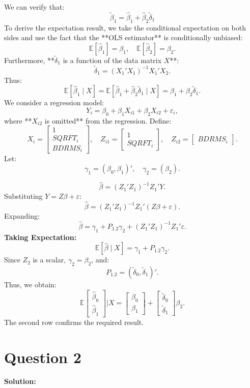 \documentclass[12pt, oneside]{article}
\begin{document}
We can verify that: 
\[
\tilde{\beta}_1 = \hat{\beta}_1 + \hat{\beta}_2 \tilde{\delta}_1
\]
To derive the expectation result, we take the conditional expectation on both sides and use the fact that the **OLS estimator** is conditionally unbiased:
\[
\mathbb{E}[\hat{\beta}_1] = \beta_1, \quad \mathbb{E}[\hat{\beta}_2] = \beta_2.
\]
Furthermore, **\(\tilde{\delta}_1\) is a function of the data matrix \(X\)**:
\[
\tilde{\delta}_1 = (X_1' X_1)^{-1} X_1' X_2.
\]
Thus:
\[
\mathbb{E}[\hat{\beta}_1 \mid X] = \mathbb{E}[\hat{\beta}_1 + \hat{\beta}_2 \tilde{\delta}_1 \mid X] = \beta_1 + \beta_2 \tilde{\delta}_1.
\]
We consider a regression model:
\[
Y_i = \beta_0 + \beta_1 X_{i1} + \beta_2 X_{i2} + \varepsilon_i,
\]
where **\(X_{i2}\) is omitted** from the regression. Define:
\[
X_i =
\begin{bmatrix} 1 \\ SQRFT_i \\ BDRMS_i \end{bmatrix}, \quad
Z_{i1} =
\begin{bmatrix} 1 \\ SQRFT_i \end{bmatrix}, \quad
Z_{i2} =
\begin{bmatrix} BDRMS_i \end{bmatrix}.
\]
Let:
\[
\gamma_1 = (\beta_0, \beta_1)', \quad \gamma_2 = (\beta_2).
\]

\[
\hat{\beta} = (Z_1'Z_1)^{-1} Z_1' Y.
\]
Substituting \( Y = Z\beta + \varepsilon \):
\[
\hat{\beta} = (Z_1'Z_1)^{-1} Z_1' (Z\beta + \varepsilon).
\]
Expanding:
\[
\hat{\beta} = \gamma_1 + P_{1.2} \gamma_2 + (Z_1'Z_1)^{-1} Z_1' \varepsilon.
\]
\textbf{Taking Expectation:}
\[
\mathbb{E}[\hat{\beta} \mid X] = \gamma_1 + P_{1.2} \gamma_2.
\]
Since \( Z_2 \) is a scalar, \( \gamma_2 = \beta_2 \), and:
\[
P_{1.2} = (\tilde{\delta}_0, \tilde{\delta}_1)'.
\]
Thus, we obtain:
\[
\mathbb{E}
\begin{bmatrix}
\hat{\beta}_0 \\ \hat{\beta}_1
\end{bmatrix}
\Bigg| X
=
\begin{bmatrix}
\beta_0 \\ \beta_1
\end{bmatrix}
+
\begin{bmatrix}
\tilde{\delta}_0 \\ \tilde{\delta}_1
\end{bmatrix}
\beta_2.
\]
The second row confirms the required result.

\section{Question 2}
\textbf{Solution:}
\end{document}
